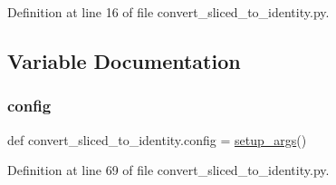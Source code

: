 Definition at line 16 of file convert\+\_\+sliced\+\_\+to\+\_\+identity.\+py.



\subsection{Variable Documentation}
\mbox{\label{namespaceconvert__sliced__to__identity_a4887a8673b51a69b946a08f73c88b713}} 
\subsubsection{\texorpdfstring{config}{config}}
{\footnotesize\ttfamily def convert\+\_\+sliced\+\_\+to\+\_\+identity.\+config = \hyperlink{namespaceconvert__sliced__to__identity_a9f82ac7f79fa007df39d00659e714fe9}{setup\+\_\+args}()}



Definition at line 69 of file convert\+\_\+sliced\+\_\+to\+\_\+identity.\+py.

